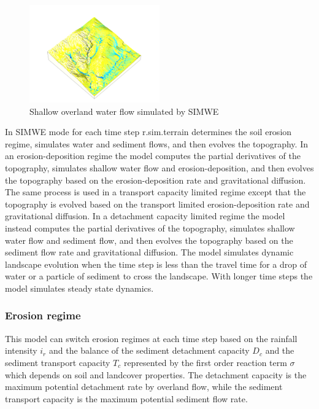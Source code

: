 \documentclass[final,3p,times,twocolumn]{elsarticle}
\begin{document}
\begin{figure}[h]
\includegraphics[width=0.5\textwidth]{../images/sample_data_3d/depth_2016.png}
\caption{Shallow overland water flow simulated by SIMWE}
\label{fig:3d}
\end{figure}

In SIMWE mode 
for each time step
\lowercase{r.sim.terrain}
determines the soil erosion regime,
simulates water and sediment flows, 
and then evolves the topography. 
In an erosion-deposition regime 
the model 
computes the partial derivatives of the topography,
simulates shallow water flow and erosion-deposition,
and then evolves the topography based on the erosion-deposition rate
and gravitational diffusion.
The same process is used in
a transport capacity limited regime
except that the topography is evolved based on 
the transport limited erosion-deposition rate
and gravitational diffusion.
In a detachment capacity limited regime
the model instead
computes the partial derivatives of the topography,
simulates shallow water flow and sediment flow,
and then evolves the topography based on the sediment flow rate
and gravitational diffusion.
The model simulates dynamic landscape evolution 
when the time step is less than the travel time 
for a drop of water or a particle of sediment to cross the landscape.
With longer time steps the model simulates steady state dynamics. 

\subsubsection{Erosion regime}
This model can switch erosion regimes at each time step
based on the rainfall intensity $i_r$
and the balance of the sediment detachment capacity $D_c$
and the sediment transport capacity $T_c$
represented by the first order reaction term $\sigma$ 
which depends on soil and landcover properties.
The detachment capacity is the maximum potential detachment rate by overland flow, while
the sediment transport capacity is the maximum potential sediment flow rate.
\end{document}
